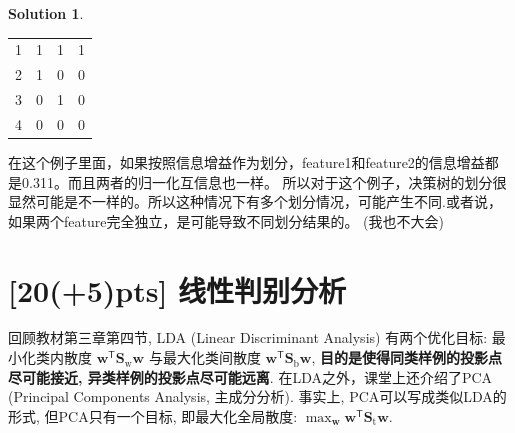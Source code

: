 \documentclass[a4paper]{article}
\numberwithin{equation}{section}
\theoremstyle{definition}
\newtheorem*{solution}{Solution}
\def \transposed {\mathsf{T}}
\def \Sw {\mathbf{S}_{\mathrm{w}}}
\def \Sb {\mathbf{S}_{\mathrm{b}}}
\def \St {\mathbf{S}_{\mathrm{t}}}
\def \w {\bm{w}}
\begin{document}
\begin{solution}
\begin{table}[ht]
\begin{tabular}{ccc|c}
            \hline
            1 & 1      & 1      & 1  \\
            2 & 1      & 0      & 0  \\
            3 & 0      & 1      & 0  \\
            4 & 0      & 0      & 0  \\
            \hline
        \end{tabular}
    \end{table}
    在这个例子里面，如果按照信息增益作为划分，feature1和feature2的信息增益都是0.311。而且两者的归一化互信息也一样。
    所以对于这个例子，决策树的划分很显然可能是不一样的。所以这种情况下有多个划分情况，可能产生不同.或者说，如果两个feature完全独立，是可能导致不同划分结果的。
    (我也不大会)
\end{solution}
\newpage

\section{[20(+5)pts] 线性判别分析 }

回顾教材第三章第四节, LDA (Linear Discriminant Analysis) 有两个优化目标: 最小化类内散度 $\w^\transposed \Sw \w$ 与最大化类间散度 $\w^\transposed \Sb \w$, \textbf{目的是使得同类样例的投影点尽可能接近, 异类样例的投影点尽可能远离}. 在LDA之外，课堂上还介绍了PCA (Principal Components Analysis, 主成分分析). 事实上, PCA可以写成类似LDA的形式, 但PCA只有一个目标, 即最大化全局散度: $\max_{\w} \w^\transposed \St \w$.
\end{document}
